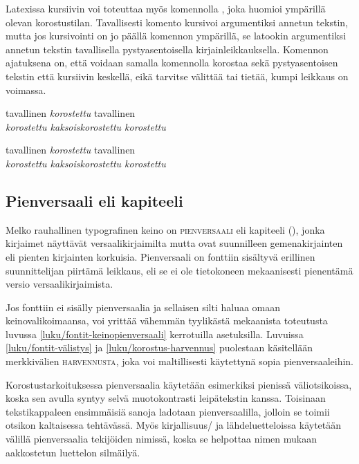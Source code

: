 Latexissa kursiivin voi toteuttaa myös komennolla , joka
huomioi ympärillä olevan korostustilan. Tavallisesti komento kursivoi
argumentiksi annetun tekstin, mutta jos kursivointi on jo päällä
komennon ympärillä, se latookin argumentiksi annetun tekstin
tavallisella pystyasentoisella kirjainleikkauksella. Komennon ajatuksena
on, että voidaan samalla komennolla korostaa sekä pystyasentoisen
tekstin että kursiivin keskellä, eikä tarvitse välittää tai tietää,
kumpi leikkaus on voimassa.

\begin{koodilohkosis}
tavallinen \emph{korostettu} tavallinen \\
\emph{korostettu \emph{kaksoiskorostettu} korostettu}
\end{koodilohkosis}

\begin{tulossis}
  tavallinen \emph{korostettu} tavallinen \\
  \emph{korostettu \emph{kaksoiskorostettu} korostettu}
\end{tulossis}

\subsection{Pienversaali eli kapiteeli}
\label{luku/korostus-pienversaali}

Melko rauhallinen typografinen keino on \textsc{pienversaali} eli
kapiteeli (), jonka kirjaimet näyttävät
versaalikirjaimilta mutta ovat suunnilleen gemenakirjainten eli pienten
kirjainten korkuisia. Pienversaali on fonttiin sisältyvä erillinen
suunnittelijan piirtämä leikkaus, eli se ei ole tietokoneen mekaanisesti
pienentämä versio versaalikirjaimista.

Jos fonttiin ei sisälly pienversaalia ja sellaisen silti haluaa omaan
keinovalikoimaansa, voi yrittää vähemmän tyylikästä mekaanista
toteutusta luvussa \ref{luku/fontit-keinopienversaali} kerrotuilla
asetuksilla. Luvuissa \ref{luku/fontit-välistys} ja
\ref{luku/korostus-harvennus} puolestaan käsitellään merkkivälien
{\scshape{} harvennusta}, joka voi
maltillisesti käytettynä sopia pienversaaleihin.

Korostustarkoituksessa pienversaalia käytetään esimerkiksi pienissä
väliotsikoissa, koska sen avulla syntyy selvä muotokontrasti
leipätekstin kanssa. Toisinaan tekstikappaleen ensimmäisiä sanoja
ladotaan pienversaalilla, jolloin se toimii otsikon kaltaisessa
tehtävässä. Myös kirjallisuus\-/{} ja lähdeluetteloissa käytetään
välillä pienversaalia tekijöiden nimissä, koska se helpottaa nimen
mukaan aakkostetun luettelon silmäilyä.

